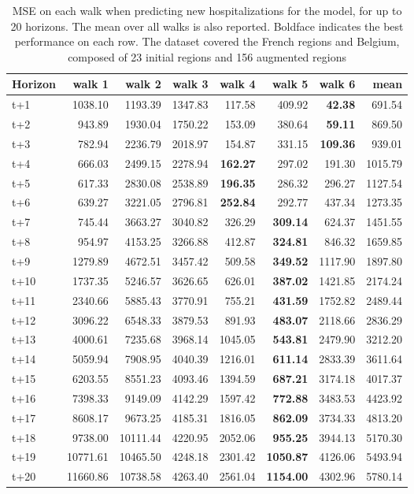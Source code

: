 \begin{table}[H]
\centering
\caption{MSE on each walk when predicting new hospitalizations for the model, for up to 20 horizons. The mean over all walks is also reported. Boldface indicates the best performance on each row. The dataset covered the French regions and Belgium, composed of 23 initial regions and 156 augmented regions }
\label{tab:MSE_walk_encoder_decoder}
\begin{tabular}{lrrrrrrr}
\toprule
Horizon &   walk 1 &   walk 2 &  walk 3 &  walk 4 &  walk 5 &  walk 6 &    mean \\
\midrule
t+1  & 1038.10  & 1193.39  & 1347.83  & 117.58  & 409.92  & \textbf{42.38}  & 691.54  \\
t+2  & 943.89  & 1930.04  & 1750.22  & 153.09  & 380.64  & \textbf{59.11}  & 869.50  \\
t+3  & 782.94  & 2236.79  & 2018.97  & 154.87  & 331.15  & \textbf{109.36}  & 939.01  \\
t+4  & 666.03  & 2499.15  & 2278.94  & \textbf{162.27}  & 297.02  & 191.30  & 1015.79  \\
t+5  & 617.33  & 2830.08  & 2538.89  & \textbf{196.35}  & 286.32  & 296.27  & 1127.54  \\
t+6  & 639.27  & 3221.05  & 2796.81  & \textbf{252.84}  & 292.77  & 437.34  & 1273.35  \\
t+7  & 745.44  & 3663.27  & 3040.82  & 326.29  & \textbf{309.14}  & 624.37  & 1451.55  \\
t+8  & 954.97  & 4153.25  & 3266.88  & 412.87  & \textbf{324.81}  & 846.32  & 1659.85  \\
t+9  & 1279.89  & 4672.51  & 3457.42  & 509.58  & \textbf{349.52}  & 1117.90  & 1897.80  \\
t+10  & 1737.35  & 5246.57  & 3626.65  & 626.01  & \textbf{387.02}  & 1421.85  & 2174.24  \\
t+11  & 2340.66  & 5885.43  & 3770.91  & 755.21  & \textbf{431.59}  & 1752.82  & 2489.44  \\
t+12  & 3096.22  & 6548.33  & 3879.53  & 891.93  & \textbf{483.07}  & 2118.66  & 2836.29  \\
t+13  & 4000.61  & 7235.68  & 3968.14  & 1045.05  & \textbf{543.81}  & 2479.90  & 3212.20  \\
t+14  & 5059.94  & 7908.95  & 4040.39  & 1216.01  & \textbf{611.14}  & 2833.39  & 3611.64  \\
t+15  & 6203.55  & 8551.23  & 4093.46  & 1394.59  & \textbf{687.21}  & 3174.18  & 4017.37  \\
t+16  & 7398.33  & 9149.09  & 4142.29  & 1597.42  & \textbf{772.88}  & 3483.53  & 4423.92  \\
t+17  & 8608.17  & 9673.25  & 4185.31  & 1816.05  & \textbf{862.09}  & 3734.33  & 4813.20  \\
t+18  & 9738.00  & 10111.44  & 4220.95  & 2052.06  & \textbf{955.25}  & 3944.13  & 5170.30  \\
t+19  & 10771.61  & 10465.50  & 4248.18  & 2301.42  & \textbf{1050.87}  & 4126.06  & 5493.94  \\
t+20  & 11660.86  & 10738.58  & 4263.40  & 2561.04  & \textbf{1154.00}  & 4302.96  & 5780.14  \\


\end{tabular}
\end{table}
